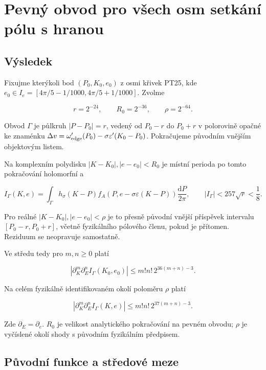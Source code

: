 \documentclass[11pt,a4paper]{article}
\theoremstyle{remark}\newtheorem{remark}[theorem]{Poznámka}
\numberwithin{equation}{section}
\begin{document}
\section{Pevný obvod pro všech osm setkání pólu s hranou}
\hypertarget{vuxfdsledek}{%
\subsection{Výsledek}\label{vuxfdsledek}}

Fixujme kterýkoli bod \((P_0,K_0,e_0)\) z osmi křivek PT25, kde
\(e_0\in I_e=[4\pi/5-1/1000,4\pi/5+1/1000]\). Zvolme

\[
\boxed{r=2^{-24},\qquad R_0=2^{-36},\qquad \rho=2^{-64}.}
\tag{QA1}
\]

Obvod \(\Gamma\) je půlkruh \(|P-P_0|=r\), vedený od \(P_0-r\) do
\(P_0+r\) v polorovině opačné ke znaménku
\(\Delta v=\omega_{\rm edge}'(P_0)-\sigma\varepsilon'(K_0-P_0)\).
Pokračujeme původním vnějším objektovým listem.

Na komplexním polydisku \(|K-K_0|,|e-e_0|<R_0\) je místní perioda po
tomto pokračování holomorfní a

\[
\boxed{
I_\Gamma(K,e)=\int_\Gamma h_\sigma(K-P)
f_A(P,e-\sigma\varepsilon(K-P))\frac{\mathrm dP}{2\pi},
\qquad |I_\Gamma|<257\sqrt r<\frac18.
}
\tag{QA2}
\]

Pro reálné \(|K-K_0|,|e-e_0|<\rho\) je to přesně původní vnější
příspěvek intervalu \([P_0-r,P_0+r]\), včetně fyzikálního pólového
členu, pokud je přítomen. Reziduum se neopravuje samostatně.

Ve středu tedy pro \(m,n\ge0\) platí

\[
\boxed{
|\partial_K^m\partial_E^nI_\Gamma(K_0,e_0)|
\le m!n!\,2^{36(m+n)-3}.
}
\tag{QA3}
\]

Na celém fyzikálně identifikovaném okolí poloměru \(\rho\) platí

\[
\boxed{
|\partial_K^m\partial_E^nI_\Gamma(K,e)|
\le m!n!\,2^{37(m+n)-3}.
}
\tag{QA4}
\]

Zde \(\partial_E=\partial_e\). \(R_0\) je velikost analytického
pokračování na pevném obvodu; \(\rho\) je vyčíslené okolí shody s
původním fyzikálním předpisem.

\hypertarget{pux16fvodnuxed-funkce-a-stux159edovuxe9-meze}{%
\subsection{Původní funkce a středové
meze}\label{pux16fvodnuxed-funkce-a-stux159edovuxe9-meze}}
\end{document}
